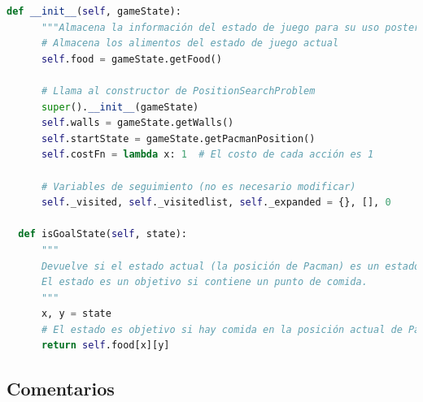 \documentclass{report}
\begin{document}
\begin{lstlisting}[language=Python, caption=Implementación final del problema de las esquinas]
  def __init__(self, gameState):
      """Almacena la información del estado de juego para su uso posterior."""
      # Almacena los alimentos del estado de juego actual
      self.food = gameState.getFood()

      # Llama al constructor de PositionSearchProblem
      super().__init__(gameState)
      self.walls = gameState.getWalls()
      self.startState = gameState.getPacmanPosition()
      self.costFn = lambda x: 1  # El costo de cada acción es 1

      # Variables de seguimiento (no es necesario modificar)
      self._visited, self._visitedlist, self._expanded = {}, [], 0

  def isGoalState(self, state):
      """
      Devuelve si el estado actual (la posición de Pacman) es un estado objetivo.
      El estado es un objetivo si contiene un punto de comida.
      """
      x, y = state
      # El estado es objetivo si hay comida en la posición actual de Pacman
      return self.food[x][y]
          \end{lstlisting}
        \subsection*{Comentarios}
\end{document}
